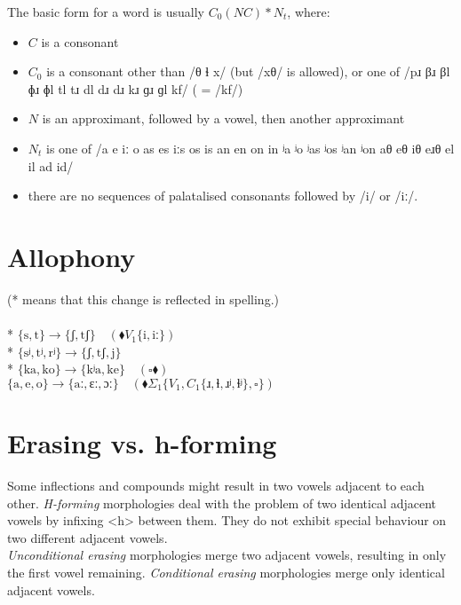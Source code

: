 \documentclass{book}
\begin{document}
The basic form for a word is usually $C_0(NC)*N_t$, where:

\begin{itemize}
  \item $C$ is a consonant
  \item $C_0$ is a consonant other than /θ ɬ x/ (but /xθ/ is allowed), or one of /pɹ βɹ βl ɸɹ ɸl tl tɹ dl dɹ dɹ kɹ ɡɹ ɡl kf/ ( = /kf/)
  \item $N$ is an approximant, followed by a vowel, then another approximant
  \item $N_t$ is one of /a e iː o as es iːs os is an en on in ʲa ʲo ʲas ʲos ʲan ʲon aθ eθ iθ eɹθ el il ad id/
  \item there are no sequences of palatalised consonants followed by /i/ or /iː/.
\end{itemize}

\section{Allophony}

(* means that this change is reflected in spelling.) \\
~\\
* $\{\text{s}, \text{t}\} \rightarrow \{\text{ʃ}, \text{tʃ}\} \quad(\blacklozenge V_1\{\text{i}, \text{iː}\})$ \\
* $\{\text{sʲ}, \text{tʲ}, \text{rʲ}\} \rightarrow \{\text{ʃ}, \text{tʃ}, \text{j}\}$ \\
* $\{\text{ka}, \text{ko}\} \rightarrow \{\text{kʲa}, \text{ke}\} \quad(\square \blacklozenge)$ \\
$\{\text{a}, \text{e}, \text{o}\} \rightarrow \{\text{aː}, \text{ɛː}, \text{ɔː}\} \quad(\blacklozenge \Sigma_1\{V_1, C_1\{\text{ɹ}, \text{ɬ}, \text{ɹʲ}, \text{ɬʲ}\}, \square\})$

\section{Erasing vs. h-forming}

Some inflections and compounds might result in two vowels adjacent to each other. \emph{H-forming} morphologies deal with the problem of two identical adjacent vowels by infixing <h> between them. They do not exhibit special behaviour on two different adjacent vowels. \\
\emph{Unconditional erasing} morphologies merge two adjacent vowels, resulting in only the first vowel remaining. \emph{Conditional erasing} morphologies merge only identical adjacent vowels.
\end{document}
